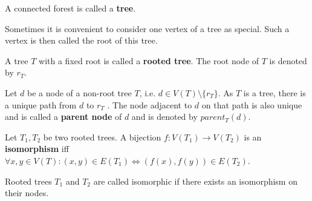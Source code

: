\begin{definition}
  A connected forest is called a {\bf tree}.
\end{definition}

Sometimes it is convenient to consider one vertex of a tree as special. Such a vertex is then called the root of this tree.

\begin{definition}
  A tree $T$ with a fixed root is called a {\bf rooted tree}. The root node of $T$ is denoted by $r_T$.
\end{definition}

\begin{definition}
  Let $d$ be a node of a non-root tree $T$, i.e. $d\in V(T)\setminus \{r_T\}$. As $T$ is a tree, there is a unique path from $d$ to $r_T$ \cite{Diestel97Graphs}. The node adjacent to $d$ on that path is also unique and is called a {\bf parent node} of $d$ and is denoted by $parent_T(d)$.
\end{definition}

\begin{definition}
  Let $T_1, T_2$ be two rooted trees. A bijection $f: V(T_1)\rightarrow V(T_2)$ is an {\bf isomorphism} iff $\forall x,y\in V(T): (x,y)\in E(T_1)\Leftrightarrow (f(x), f(y))\in E(T_2)$.
\end{definition}

Rooted trees $T_1$ and $T_2$ are called isomorphic if there exists an isomorphism on their nodes.

